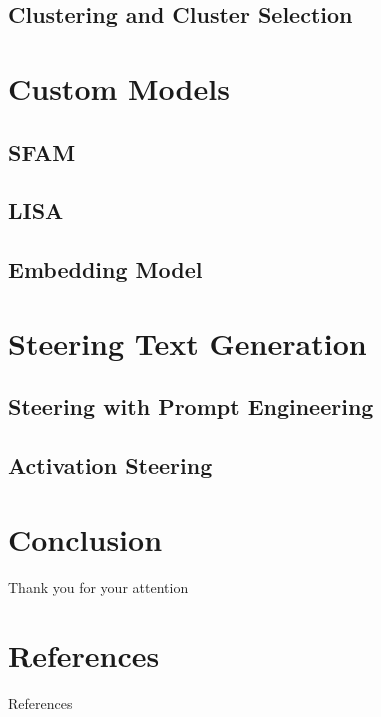 \documentclass[t]{beamer}
\begin{document}
\subsection{Clustering and Cluster Selection}
\begin{frame}{}

\end{frame}


\section{Custom Models}
\subsection{SFAM}

\subsection{LISA}

\subsection{Embedding Model}


\section{Steering Text Generation}
\subsection{Steering with Prompt Engineering}

\subsection{Activation Steering}


\section{Conclusion}



\begin{frame}[c]
  \centering \Large
  Thank you for your attention
\end{frame}


\section*{References}
\begin{frame}[allowframebreaks]{References}
  \printbibliography
\end{frame}
\end{document}
